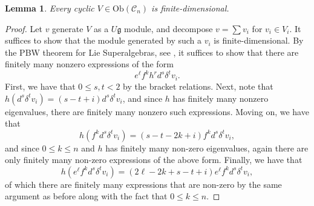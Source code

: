 \documentclass{amsart}
\newtheorem{lemma}[theorem]{Lemma}
\theoremstyle{definition}
\begin{document}
\begin{lemma}\label{Cyclicfindim}
    Every cyclic $V \in \mathrm{Ob}(\mathscr{C}_n)$ is finite-dimensional.
\end{lemma}
\begin{proof}
Let $v$ generate $V$ as a $U\mathfrak{g}$ module, and decompose $v = \sum v_i$ for $v_i \in V_i$. It suffices to show that the module generated by such a $v_i$ is finite-dimensional. By the PBW theorem for Lie Superalgebras, see \cite[Theorem 6.1.1]{MR2906817}, it suffices to show that there are finitely many nonzero expressions of the form
\begin{equation*}
    e^\ell f^k h^r d^s \delta^t v_i.
\end{equation*}
First, we have that $0 \leq s,t <2$ by the bracket relations. Next, note that $h(d^s\delta^tv_i)=(s-t+i)d^s\delta^tv_i$, and since $h$ has finitely many nonzero eigenvalues, there are finitely many nonzero such expressions. Moving on, we have that
\begin{equation*}
    h(f^k d^s \delta^t v_i) = (s-t-2k+i) f^k d^s \delta^t v_i,
\end{equation*}
and since $0 \leq k \leq n$ and $h$ has finitely many non-zero eigenvalues, again there are only finitely many non-zero  expressions of the above form. Finally, we have that
\begin{equation*}
    h(e^\ell f^k d^s \delta^t v_i) = (2\ell -2k+s-t+i)e^\ell f^k d^s \delta^t v_i,
\end{equation*}
of which there are finitely many expressions that are non-zero by the same argument as before along with the fact that $0 \leq k \leq n$.
\end{proof} 
  
\end{document}
